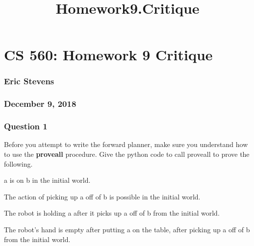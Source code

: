 \documentclass[11pt]{article}
\title{Homework9.Critique}
\begin{document}
    
    
    \maketitle
    
    

    
    \hypertarget{cs-560-homework-9-critique}{%
\section{CS 560: Homework 9 Critique}\label{cs-560-homework-9-critique}}

\hypertarget{eric-stevens}{%
\subsubsection{Eric Stevens}\label{eric-stevens}}

\hypertarget{december-9-2018}{%
\subsubsection{December 9, 2018}\label{december-9-2018}}

    \hypertarget{question-1}{%
\subsubsection{Question 1}\label{question-1}}

    Before you attempt to write the forward planner, make sure you
understand how to use the \textbf{proveall} procedure. Give the python
code to call proveall to prove the following.

    a is on b in the initial world.

The action of picking up a off of b is possible in the initial world.

The robot is holding a after it picks up a off of b from the initial
world.

The robot's hand is empty after putting a on the table, after picking up
a off of b from the initial world.
\end{document}
